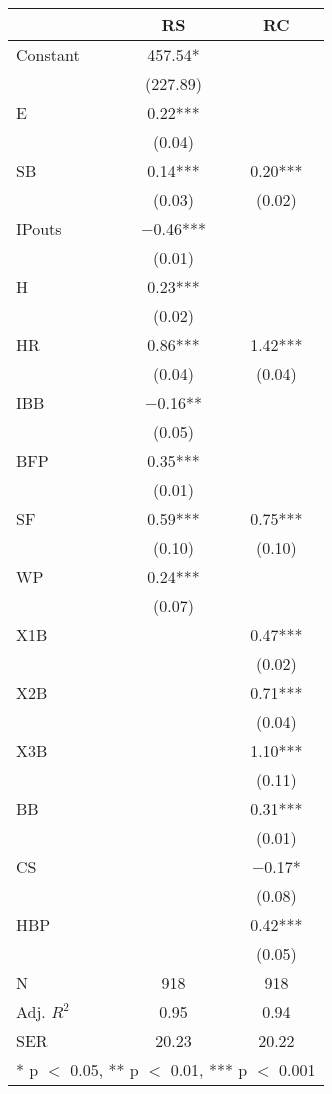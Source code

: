 \begin{table}
\centering
\begin{tabular}[t]{lcc}
\toprule
  & RS & RC\\
\midrule
Constant & \num{457.54}* & \\
 & (\num{227.89}) & \\
E & \num{0.22}*** & \\
 & (\num{0.04}) & \\
SB & \num{0.14}*** & \num{0.20}***\\
 & (\num{0.03}) & (\num{0.02})\\
IPouts & \num{-0.46}*** & \\
 & (\num{0.01}) \vphantom{1} & \\
H & \num{0.23}*** & \\
 & (\num{0.02}) & \\
HR & \num{0.86}*** & \num{1.42}***\\
 & (\num{0.04}) & (\num{0.04})\\
IBB & \num{-0.16}** & \\
 & (\num{0.05}) & \\
BFP & \num{0.35}*** & \\
 & (\num{0.01}) & \\
SF & \num{0.59}*** & \num{0.75}***\\
 & (\num{0.10}) & (\num{0.10})\\
WP & \num{0.24}*** & \\
 & (\num{0.07}) & \\
X1B &  & \num{0.47}***\\
 &  & (\num{0.02})\\
X2B &  & \num{0.71}***\\
 &  & (\num{0.04})\\
X3B &  & \num{1.10}***\\
 &  & (\num{0.11})\\
BB &  & \num{0.31}***\\
 &  & (\num{0.01})\\
CS &  & \num{-0.17}*\\
 &  & (\num{0.08})\\
HBP &  & \num{0.42}***\\
 &  & (\num{0.05})\\
\midrule
N & \num{918} & \num{918}\\
Adj. $R^2$ & \num{0.95} & \num{0.94}\\
SER & \num{20.23} & \num{20.22}\\
\bottomrule
\multicolumn{3}{l}{\rule{0pt}{1em}* p $<$ 0.05, ** p $<$ 0.01, *** p $<$ 0.001}\\
\end{tabular}
\end{table}
